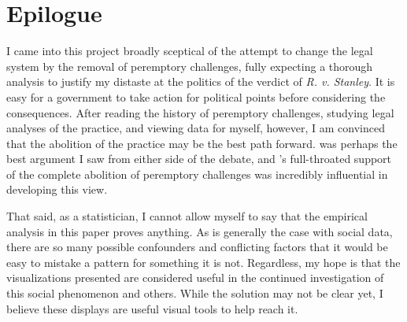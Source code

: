 \chapter*{Epilogue}
\label{s:Epilogue}

I came into this project broadly sceptical of the attempt to change the legal system by the removal of peremptory challenges,
fully expecting a thorough analysis to justify my distaste at the politics of the verdict of
\textit{R. v. Stanley}. It is easy for a government to take action for political points before considering the
consequences. After reading the history of peremptory challenges, studying legal analyses of the practice, and viewing data for
myself, however, I am convinced that the abolition of the practice may be the best path forward. \cite{hoffman1997} was perhaps
the best argument I saw from either side of the debate, and \citeauthor{hoffman1997}'s full-throated support of the complete
abolition of peremptory challenges was incredibly influential in developing this view.

That said, as a statistician, I cannot allow myself to say that the empirical analysis in this paper proves anything. As is
generally the case with social data, there are so many possible confounders and conflicting factors that it would be easy to
mistake a pattern for something it is not. Regardless, my hope is that the visualizations presented are considered useful in the
continued investigation of this social phenomenon and others. While the solution may not be clear yet, I believe these displays
are useful visual tools to help reach it.



